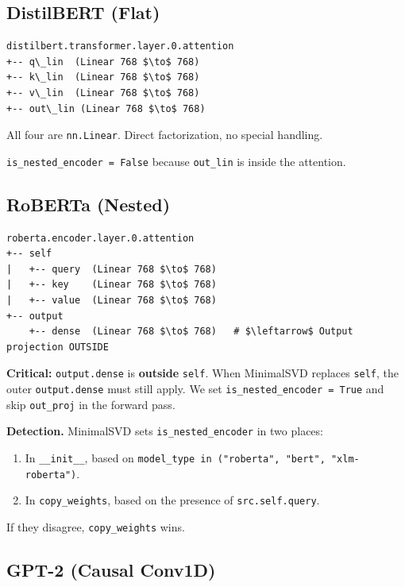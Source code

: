 \subsection{DistilBERT (Flat)}

\begin{lstlisting}
distilbert.transformer.layer.0.attention
+-- q\_lin  (Linear 768 $\to$ 768)
+-- k\_lin  (Linear 768 $\to$ 768)
+-- v\_lin  (Linear 768 $\to$ 768)
+-- out\_lin (Linear 768 $\to$ 768)
\end{lstlisting}

All four are \texttt{nn.Linear}. Direct factorization, no special handling.

\texttt{is\_nested\_encoder = False} because \texttt{out\_lin} is inside the attention.

\subsection{RoBERTa (Nested)}

\begin{lstlisting}
roberta.encoder.layer.0.attention
+-- self
|   +-- query  (Linear 768 $\to$ 768)
|   +-- key    (Linear 768 $\to$ 768)
|   +-- value  (Linear 768 $\to$ 768)
+-- output
    +-- dense  (Linear 768 $\to$ 768)   # $\leftarrow$ Output projection OUTSIDE
\end{lstlisting}

\textbf{Critical:} \texttt{output.dense} is \textbf{outside} \texttt{self}. When MinimalSVD replaces 
\texttt{self}, the outer \texttt{output.dense} must still apply. We set 
\texttt{is\_nested\_encoder = True} and skip \texttt{out\_proj} in the forward pass.

\textbf{Detection.} MinimalSVD sets \texttt{is\_nested\_encoder} in two places:

\begin{enumerate}
\item In \texttt{\_\_init\_\_}, based on \texttt{model\_type in ("roberta", "bert", "xlm-roberta")}.
\item In \texttt{copy\_weights}, based on the presence of \texttt{src.self.query}.

\end{enumerate}
If they disagree, \texttt{copy\_weights} wins.

\subsection{GPT-2 (Causal Conv1D)}

